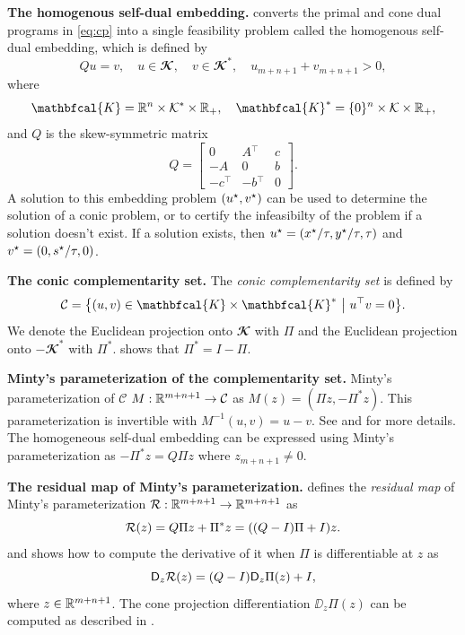 \textbf{The homogenous self-dual embedding.}
\citet{ye1994nl} converts the primal and cone dual programs
in \cref{eq:cp} into a single feasibility problem called
the homogenous self-dual embedding, which is defined by
\begin{equation}
\label{e:hsde:1}
Qu = v, \quad u \in \mathbfcal{K},
\quad v \in \mathbfcal{K}^*, \quad u_{m+n+1} +
 v_{m+n+1} >0,
\end{equation}
where
\[
\mathbfcal{K} = \RR^n \times \mathcal{K}^*\times \RR_+, \quad
\mathbfcal{K}^* = \{0\}^n\times \mathcal{K}\times \RR_+,
\]
and $Q$ is the skew-symmetric matrix
\[
	Q = \begin{bmatrix}
		0 & A{^\top} & c\\
		-A & 0 & b \\
		-c{^\top} & -b{^\top} & 0
	\end{bmatrix}.
\]
A solution to this embedding problem $({u^\star}, {v^\star})$
can be used to determine the solution of a conic
problem, or to certify the infeasibilty of the
problem if a solution doesn't exist.
If a solution exists, then
${u^\star}=({x^\star}/\tau,{y^\star}/\tau,\tau)$
and
${v^\star}=(0, {s^\star}/\tau, 0)$.

\textbf{The conic complementarity set.}
The \emph{conic complementarity set} is defined by
\begin{equation}
\label{eq:con:com:set}
\mathcal{C} = \menge{(u,v) \in
  \mathbfcal{K} \times \mathbfcal{K}^* }{u^\top v = 0}.
\end{equation}
We denote
the Euclidean projection onto
$\mathbfcal{K}$ with $\Pi$
and
the Euclidean projection onto
$-\mathbfcal{K}^*$ with $\Pi^*$.
\citet{moreau1961decomposition} shows that
$\Pi^*=I-\Pi$.

\textbf{Minty's parameterization of the complementarity set.}
Minty's parameterization of $\mathcal{C}$
$M: \mathbb{R}^{m+n+1} \to \mathcal{C}$ as
$M(z) = (\Pi z, -\Pi^* z)$.
This parameterization is invertible with
$M^{-1}(u,v) = u-v$.
See
\citet[Corollary~31.5.1]{rockafellar1970convex}
and \citet[Remark~23.23(i)]{bauschke2017convex}
for more details.
The homogeneous self-dual embedding can be expressed
using Minty's parameterization as
$-\Pi^* z=Q\Pi z$ where $z_{m+n+1} \neq 0$.

\textbf{The residual map of Minty's parameterization.}
\label{sec-residual-map}
\citet{busseti2018solution} defines the
\emph{residual map} of Minty's parameterization
$\mathcal{R}: \mathbb{R}^{m+n+1}\to \mathbb{R}^{m+n+1}$
as
\begin{equation}
\label{eq-residual}
\mathcal{R}(z) = Q\Pi z+\Pi^*z=((Q-I)\Pi+I)z.
\end{equation}
and shows how to compute the derivative of it
when $\Pi$ is differentiable at $z$ as
\begin{equation}
\label{eq:res:der}
\mathsf{D}_z\mathcal{R}(z) =(Q-I)\mathsf{D}_z\Pi(z) +I,
\end{equation}
where $z\in \mathbb{R}^{m+n+1}$.
The cone projection differentiation $\DD_z \Pi(z)$
can be computed as described in
\citet{ali2017semismooth}.

